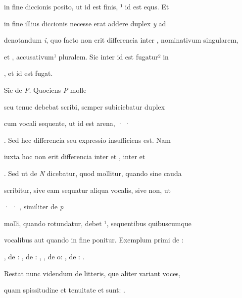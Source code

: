 \obeylines

 in fine diccionis posito, ut  id est finis, ¹ id est equs. Et

in fine illius diccionis  necesse erat addere duplex \textit{y} ad

denotandum \textit{i}, quo facto non erit differencia inter , nominativum singularem,

et , accusativum¹ pluralem. Sic inter  id est fugatur² in 

\splitlines
{}, et  id est fugat.

\indentK Sic de \textit{P}. Quociens \textit{P} molle

\fulllines
seu tenue debebat scribi, semper subiciebatur duplex 

cum vocali sequente, ut  id est arena, · ·

. Sed hec differencia seu expressio insufficiens est. Nam

iuxta hoc non erit differencia inter  et , inter  et

. Sed ut de \textit{N} dicebatur, quod mollitur, quando sine cauda

scribitur, sive eam sequatur aliqua vocalis, sive non, ut

 · · , similiter de \textit{p}

molli, quando rotundatur, debet ¹, sequentibus quibuscumque

vocalibus aut quando in fine ponitur. Exemplum primi de :

, de : , de : , , de o\parkosz{}: , de : .

\indentP Restat nunc videndum de litteris, que aliter variant voces,

\splitlines
quam spissitudine et tenuitate et sunt:    .

